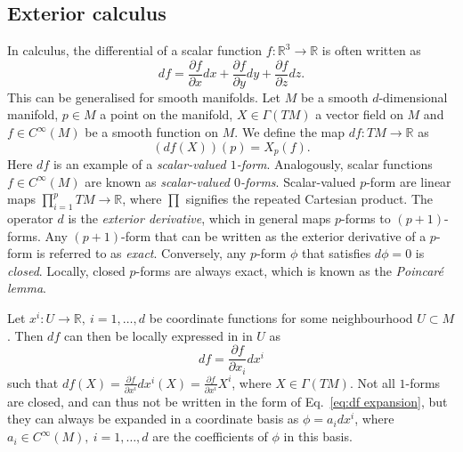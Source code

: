 \subsection{Exterior calculus} \label{sec:Exterior calculus}

In calculus, the differential of a scalar function $f : \mathbb{R}^3 \to \mathbb{R}$ is often written as
\begin{equation}
df = \frac{\partial f}{\partial x} d x + \frac{\partial f}{\partial y} d y + \frac{\partial f}{\partial z} d z.
\end{equation}
This can be generalised for smooth manifolds. Let $M$ be a smooth $d$-dimensional manifold, $p \in M$ a point on the manifold, $X \in \Gamma(TM)$ a vector field on $M$ and $f \in C^\infty(M)$ be a smooth function on $M$. We define the map $df : TM \to \mathbb{R}$ as
\begin{equation} \label{eq:df action}
(df(X))(p) = X_p(f).
\end{equation}
Here $df$ is an example of a \textit{scalar-valued $1$-form}. Analogously, scalar functions $f \in C^\infty(M)$ are known as \textit{scalar-valued $0$-forms}. Scalar-valued $p$-form are linear maps $\prod_{i=1}^p TM \to \mathbb{R}$, where $\prod$ signifies the repeated Cartesian product. The operator $d$ is the \textit{exterior derivative}, which in general maps $p$-forms to $(p+1)$-forms. Any $(p+1)$-form that can be written as the exterior derivative of a $p$-form is referred to as \textit{exact}. Conversely, any $p$-form $\phi$ that satisfies $d \phi = 0$ is \textit{closed}. Locally, closed $p$-forms are always exact, which is known as the \textit{Poincaré lemma}. 
 
Let $x^i : U \to \mathbb{R},\ i=1,\dots,d$ be coordinate functions for some neighbourhood $U \subset M$. Then $df$ can then be locally expressed in in $U$ as
\begin{equation} \label{eq:df expansion}
df = \frac{\partial f}{\partial x_i} d x^i
\end{equation}
such that $df(X) = \frac{\partial f}{\partial x^i} dx^i(X) = \frac{\partial f}{\partial x^i} X^i$, where $X \in \Gamma(TM)$. Not all $1$-forms are closed, and can thus not be written in the form of Eq.~\ref{eq:df expansion}, but they can always be expanded in a coordinate basis as $\phi = a_i dx^i$, where $a_i \in C^\infty(M),\ i=1,\dots,d$ are the coefficients of $\phi$ in this basis.

